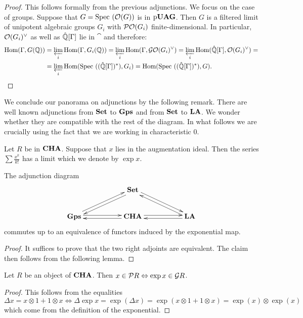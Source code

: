 \begin{proof}
This follows formally from the previous adjunctions. We focus on the case of groups. Suppose that $G=\mathrm{Spec}~(\mathcal{O}(G))$ is in $\operatorname{p\bf{UAG}}$. Then $G$ is a filtered limit of unipotent algebraic groups $G_i$ with $\mathcal{P}\mathcal{O}(G_i)$ finite-dimensional. In particular, $\mathcal{O}(G_i)^\vee$ as well as $\hat{\mathbb{Q}}[\Gamma]$ lie in $\cat$ and therefore:
\[
\begin{aligned}
\mathrm{Hom}(\Gamma,G(\mathbb{Q}))&=\varprojlim_i\mathrm{Hom}(\Gamma,G_i(\mathbb{Q}))=\varprojlim_i\mathrm{Hom}(\Gamma,\mathcal{G}\mathcal{O}(G_i)^\vee)=\varprojlim_i\mathrm{Hom}(\hat{\mathbb{Q}}[\Gamma],\mathcal{O}(G_i)^\vee)=\\&=\varprojlim_i\mathrm{Hom}(\mathrm{Spec}~((\hat{\mathbb{Q}}[\Gamma])^*),G_i)=\mathrm{Hom}(\mathrm{Spec}~((\hat{\mathbb{Q}}[\Gamma])^*),G).
\end{aligned}\]
\end{proof}

We conclude our panorama on adjunctions by the following remark. There are well known adjunctions from $\operatorname{\bf{Set}}$ to $\operatorname{\bf{Gps}}$ and from $\operatorname{\bf{Set}}$ to $\operatorname{\bf{LA}}$. We wonder whether they are compatible with the rest of the diagram. In what follows we are crucially using the fact that we are working in characteristic $0$.

Let $R$ be in $\operatorname{\bf{CHA}}$. Suppose that $x$ lies in the augmentation ideal. Then the series $\sum\frac{x^k}{k!}$ has a limit which we denote by $\exp x$. 

\begin{prop}\label{adj}
The adjunction diagram
$$\xymatrix{
&&\Set\ar@<0.5ex>[dll]\ar@<0.5ex>[drr]\\
\Gps\ar@<0.5ex>[urr]\ar@<0.5ex>[rr]&&\CHA\ar@<0.5ex>[rr]\ar@<0.5ex>[ll]&&\LA\ar@<0.5ex>[ull]\ar@<0.5ex>[ll]
}$$
commutes up to an equivalence of functors induced by the exponential map.
\end{prop}

\begin{proof}
It suffices to prove that the two right adjoints are equivalent. The claim then follows from the following lemma.
\end{proof}

\begin{lemma}
Let $R$ be an object of $\operatorname{\bf{CHA}}$. Then $x\in\mathcal{P} R\Leftrightarrow \exp x\in\mathcal{G} R$.
\end{lemma}

\begin{proof}
This follows from the equalities
\[
\Delta x=x\otimes1+1\otimes x\Leftrightarrow \Delta\exp x=\exp(\Delta x)=\exp(x\otimes1+1\otimes x)=\exp(x)\otimes\exp(x)
\]
which come from the definition of the exponential.
\end{proof}

